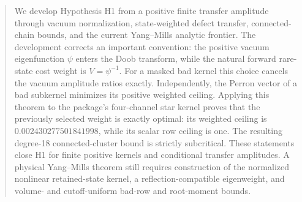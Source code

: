 \begin{abstract}
We develop Hypothesis H1 from a positive finite transfer amplitude through
vacuum normalization, state-weighted defect transfer, connected-chain bounds,
and the current Yang--Mills analytic frontier.  The development corrects an
important convention: the positive vacuum eigenfunction \(\psi\) enters the
Doob transform, while the natural forward rare-state cost weight is
\(V=\psi^{-1}\).  For a masked bad kernel this choice cancels the vacuum
amplitude ratios exactly.  Independently, the Perron vector of a bad
subkernel minimizes its positive weighted ceiling.  Applying this theorem to
the package's four-channel star kernel proves that the previously selected
weight is exactly optimal: its weighted ceiling is
\(0.002430277501841998\), while its scalar row ceiling is one.  The resulting
degree-18 connected-cluster bound is strictly subcritical.  These statements
close H1 for finite positive kernels and conditional transfer amplitudes.  A
physical Yang--Mills theorem still requires construction of the normalized
nonlinear retained-state kernel, a reflection-compatible eigenweight, and
volume- and cutoff-uniform bad-row and root-moment bounds.
\end{abstract}
